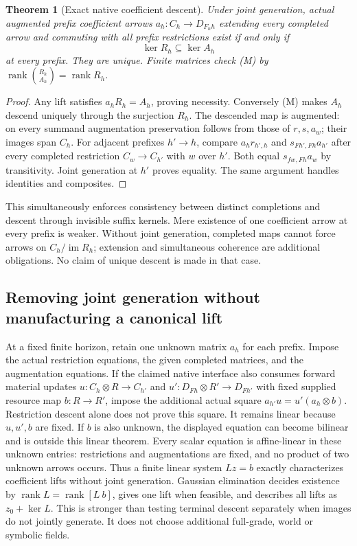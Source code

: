 \documentclass{article}
\newtheorem{theorem}{Theorem}\newtheorem{proposition}{Proposition}
\begin{document}
\begin{theorem}[Exact native coefficient descent]
Under joint generation, actual augmented prefix coefficient arrows $a_h:C_h\to D_{F_nh}$ extending every completed arrow and commuting with all prefix restrictions exist if and only if
\[
                  \ker R_h\subseteq\ker A_h                 \tag{M}
\]
at every prefix. They are unique. Finite matrices check (M) by
$\operatorname{rank}\binom{R_h}{A_h}=\operatorname{rank}R_h$.
\end{theorem}
\begin{proof}
Any lift satisfies $a_hR_h=A_h$, proving necessity. Conversely (M) makes $A_h$ descend uniquely through the surjection $R_h$. The descended map is augmented: on every summand augmentation preservation follows from those of $r,s,a_w$; their images span $C_h$. For adjacent prefixes $h'\to h$, compare $a_h r_{h',h}$ and $s_{Fh',Fh}a_{h'}$ after every completed restriction $C_w\to C_{h'}$ with $w$ over $h'$. Both equal $s_{fw,Fh}a_w$ by transitivity. Joint generation at $h'$ proves equality. The same argument handles identities and composites.\end{proof}
This simultaneously enforces consistency between distinct completions and descent through invisible suffix kernels. Mere existence of one coefficient arrow at every prefix is weaker. Without joint generation, completed maps cannot force arrows on $C_h/\operatorname{im}R_h$; extension and simultaneous coherence are additional obligations. No claim of unique descent is made in that case.

\subsection*{Removing joint generation without manufacturing a canonical lift}
At a fixed finite horizon, retain one unknown matrix $a_h$ for each prefix. Impose the actual restriction equations, the given completed matrices, and the augmentation equations. If the claimed native interface also consumes forward material updates $u:C_h\otimes R\to C_{h\prime}$ and $u\prime:D_{Fh}\otimes R\prime\to D_{Fh\prime}$ with fixed supplied resource map $b:R\to R\prime$, impose the additional actual square $a_{h\prime}u=u\prime(a_h\otimes b)$. Restriction descent alone does not prove this square. It remains linear because $u,u\prime,b$ are fixed. If $b$ is also unknown, the displayed equation can become bilinear and is outside this linear theorem. Every scalar equation is affine-linear in these unknown entries: restrictions and augmentations are fixed, and no product of two unknown arrows occurs. Thus a finite linear system $Lz=b$ exactly characterizes coefficient lifts without joint generation. Gaussian elimination decides existence by $\operatorname{rank}L=\operatorname{rank}[L\ b]$, gives one lift when feasible, and describes all lifts as $z_0+\ker L$. This is stronger than testing terminal descent separately when images do not jointly generate. It does not choose additional full-grade, world or symbolic fields.
\end{document}
